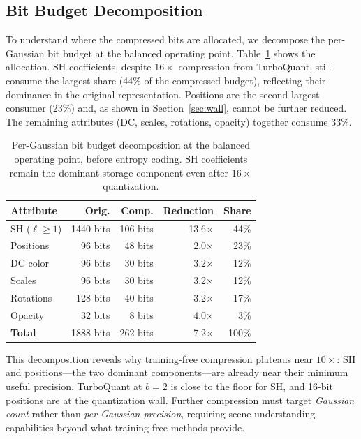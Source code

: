 \documentclass[sigconf,review]{acmart}
\begin{document}
\subsection{Bit Budget Decomposition}
\label{sec:budget}

To understand where the compressed bits are allocated, we decompose the per-Gaussian bit budget at the balanced operating point.
Table~\ref{tab:budget} shows the allocation.
SH coefficients, despite $16{\times}$ compression from TurboQuant, still consume the largest share (44\% of the compressed budget), reflecting their dominance in the original representation.
Positions are the second largest consumer (23\%) and, as shown in Section~\ref{sec:wall}, cannot be further reduced.
The remaining attributes (DC, scales, rotations, opacity) together consume 33\%.

\begin{table}[t]
\centering
\caption{Per-Gaussian bit budget decomposition at the balanced operating point, before entropy coding. SH coefficients remain the dominant storage component even after $16{\times}$ quantization.}
\label{tab:budget}
\small
\begin{tabular}{lrrrr}
\toprule
\textbf{Attribute} & \textbf{Orig.} & \textbf{Comp.} & \textbf{Reduction} & \textbf{Share} \\
\midrule
SH ($\ell \geq 1$) & 1440 bits & 106 bits & 13.6$\times$ & 44\% \\
Positions           & 96 bits   & 48 bits  & 2.0$\times$  & 23\% \\
DC color            & 96 bits   & 30 bits  & 3.2$\times$  & 12\% \\
Scales              & 96 bits   & 30 bits  & 3.2$\times$  & 12\% \\
Rotations           & 128 bits  & 40 bits  & 3.2$\times$  & 17\% \\
Opacity             & 32 bits   & 8 bits   & 4.0$\times$  & 3\% \\
\midrule
\textbf{Total}      & 1888 bits & 262 bits & 7.2$\times$  & 100\% \\
\bottomrule
\end{tabular}
\end{table}

This decomposition reveals why training-free compression plateaus near $10{\times}$: SH and positions---the two dominant components---are already near their minimum useful precision.
TurboQuant at $b{=}2$ is close to the floor for SH, and 16-bit positions are at the quantization wall.
Further compression must target \emph{Gaussian count} rather than \emph{per-Gaussian precision}, requiring scene-understanding capabilities beyond what training-free methods provide.
\end{document}
